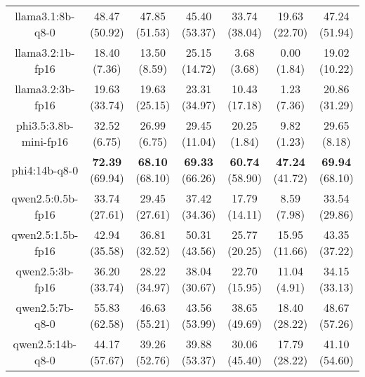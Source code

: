 \begin{table}[hbp]
{\begin{tabular}{ccccccc}
      \multicolumn{1}{c|}{llama3.1:8b-q8-0} & 48.47 (50.92) & 47.85 (51.53) & \multicolumn{1}{c|}{45.40 (53.37)} & 33.74 (38.04) & \multicolumn{1}{c|}{19.63 (22.70)} & 47.24 (51.94) \\


      \multicolumn{1}{c|}{llama3.2:1b-fp16} & 18.40 (7.36) & 13.50 (8.59) & \multicolumn{1}{c|}{25.15 (14.72)} & 3.68 (3.68) & \multicolumn{1}{c|}{0.00 (1.84)} & 19.02 (10.22) \\


      \multicolumn{1}{c|}{llama3.2:3b-fp16} & 19.63 (33.74) & 19.63 (25.15) & \multicolumn{1}{c|}{23.31 (34.97)} & 10.43 (17.18) & \multicolumn{1}{c|}{1.23 (7.36)} & 20.86 (31.29) \\


      \multicolumn{1}{c|}{phi3.5:3.8b-mini-fp16} & 32.52 (6.75) & 26.99 (6.75) & \multicolumn{1}{c|}{29.45 (11.04)} & 20.25 (1.84) & \multicolumn{1}{c|}{9.82 (1.23)} & 29.65 (8.18) \\


      \multicolumn{1}{c|}{phi4:14b-q8-0} & \textbf{72.39} (69.94) & \textbf{68.10} (68.10) & \multicolumn{1}{c|}{\textbf{69.33} (66.26)} & \textbf{60.74} (58.90) & \multicolumn{1}{c|}{\textbf{47.24} (41.72)} & \textbf{69.94} (68.10) \\


      \multicolumn{1}{c|}{qwen2.5:0.5b-fp16} & 33.74 (27.61) & 29.45 (27.61) & \multicolumn{1}{c|}{37.42 (34.36)} & 17.79 (14.11) & \multicolumn{1}{c|}{8.59 (7.98)} & 33.54 (29.86) \\


      \multicolumn{1}{c|}{qwen2.5:1.5b-fp16} & 42.94 (35.58) & 36.81 (32.52) & \multicolumn{1}{c|}{50.31 (43.56)} & 25.77 (20.25) & \multicolumn{1}{c|}{15.95 (11.66)} & 43.35 (37.22) \\


      \multicolumn{1}{c|}{qwen2.5:3b-fp16} & 36.20 (33.74) & 28.22 (34.97) & \multicolumn{1}{c|}{38.04 (30.67)} & 22.70 (15.95) & \multicolumn{1}{c|}{11.04 (4.91)} & 34.15 (33.13) \\


      \multicolumn{1}{c|}{qwen2.5:7b-q8-0} & 55.83 (62.58) & 46.63 (55.21) & \multicolumn{1}{c|}{43.56 (53.99)} & 38.65 (49.69) & \multicolumn{1}{c|}{18.40 (28.22)} & 48.67 (57.26) \\


      \multicolumn{1}{c|}{qwen2.5:14b-q8-0} & 44.17 (57.67) & 39.26 (52.76) & \multicolumn{1}{c|}{39.88 (53.37)} & 30.06 (45.40) & \multicolumn{1}{c|}{17.79 (28.22)} & 41.10 (54.60) \\



\end{tabular}}
\end{table}
